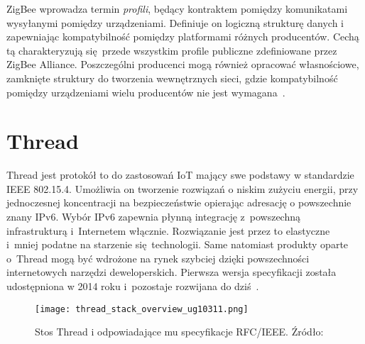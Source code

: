 ZigBee wprowadza termin \textit{profili}, będący kontraktem pomiędzy komunikatami wysyłanymi pomiędzy urządzeniami. Definiuje on
logiczną strukturę danych i zapewniając kompatybilność pomiędzy platformami różnych producentów. Cechą tą charakteryzują
się przede wszystkim profile publiczne zdefiniowane przez ZigBee Alliance. Poszczególni producenci mogą 
również opracować własnościowe, zamknięte struktury do tworzenia wewnętrznych sieci, gdzie kompatybilność pomiędzy
urządzeniami wielu producentów nie jest wymagana~\cite{zigbee_alliance_zigbee_2017, stmicroelectronics_an5506_2020, zigbee_alliance_zigbee_2017}.

\section{Thread}
Thread jest protokół to do zastosowań \gls{IoT} mający swe podstawy w standardzie IEEE 802.15.4.
Umożliwia on tworzenie rozwiązań o niskim zużyciu energii, przy jednoczesnej koncentracji na bezpieczeństwie opierając
adresację o powszechnie znany IPv6. Wybór IPv6 zapewnia płynną integrację z~powszechną infrastrukturą
i~Internetem włącznie. Rozwiązanie jest przez to elastyczne i~mniej podatne na starzenie się technologii.
Same natomiast produkty oparte o~Thread mogą być wdrożone na rynek szybciej dzięki powszechności
internetowych narzędzi deweloperskich. Pierwsza wersja specyfikacji została udostępniona
w 2014 roku i~pozostaje rozwijana do dziś~\cite{noauthor_thread_nodate}.

\begin{figure}[!ht]
	\centering \texttt{[image: thread\_stack\_overview\_ug10311.png]}
	\caption{Stos Thread i odpowiadające mu specyfikacje RFC/IEEE. Źródło:~\cite{silicon_laboratories_ug10311_2022}}
	\label{rys:thread_stack_overview_ug10311}
\end{figure}

